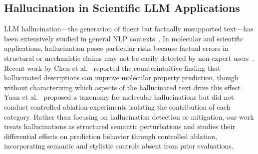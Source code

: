 \subsection{Hallucination in Scientific LLM Applications}
LLM hallucination---the generation of fluent but factually unsupported text---has been extensively studied in general NLP contexts~\cite{ji2023survey, huang2023survey}. In molecular and scientific applications, hallucination poses particular risks because factual errors in structural or mechanistic claims may not be easily detected by non-expert users~\cite{ramos2024review}. Recent work by Chen et al.~\cite{chen2023llm4mol} reported the counterintuitive finding that hallucinated descriptions can improve molecular property prediction, though without characterizing which aspects of the hallucinated text drive this effect. Yuan et al.~\cite{yuan2025hallucination} proposed a taxonomy for molecular hallucinations but did not conduct controlled ablation experiments isolating the contribution of each category. Rather than focusing on hallucination detection or mitigation, our work treats hallucinations as structured semantic perturbations and studies their differential effects on prediction behavior through controlled ablation, incorporating semantic and stylistic controls absent from prior evaluations.
